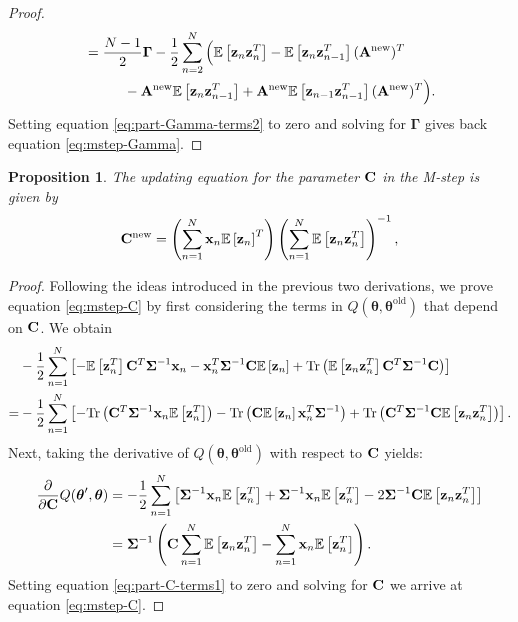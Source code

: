 \documentclass[11pt]{article}
\numberwithin{equation}{section}
\newcommand{\expectation}[1]{\mathbb{E}\left[#1\right]}
\newcommand{\Tr}[1]{\text{Tr}\left(#1\right)}
\newcommand{\x}{{\bf x}}
\newcommand{\z}{{\bf z}}
\newtheorem{proposition}{Proposition}[section]
\begin{document}
\begin{proof}
\begin{align}
		&= \frac{N-1}{2}\boldsymbol\Gamma -\frac{1}{2}\sum_{n=2}^N\Big(\expectation{\z_n\z_n^T} - \expectation{\z_n\z_{n-1}^T}({\bf A}^{\text{new}})^T  \nonumber \\
		& \hspace{1cm} - {\bf A}^{\text{new}}\expectation{\z_n\z_{n-1}^T} + {\bf A}^{\text{new}}\expectation{\z_{n-1}\z_{n-1}^T}({\bf A}^{\text{new}})^T\Big). \label{eq:part-Gamma-terms2}
	\end{align}	
	Setting equation \eqref{eq:part-Gamma-terms2} to zero and solving for $\boldsymbol{\Gamma}$ gives back equation \eqref{eq:mstep-Gamma}.
\end{proof}

\begin{proposition}
	The updating equation for the parameter ${\bf C}$ in the M-step is given by
	\begin{align}
		{\bf C}^{\text{\normalfont new}} &= \left(\sum_{n=1}^N \x_n \expectation{\z_n}^T \right)\left(\sum_{n=1}^N \expectation{\z_n \z_n^T} \right)^{-1}, \label{eq:mstep-C}\\
	\end{align}
\end{proposition}

\begin{proof}
	Following the ideas introduced in the previous two derivations, we prove equation \eqref{eq:mstep-C} by first considering the terms in $Q(\boldsymbol\theta, \boldsymbol\theta^\text{old})$ that depend on $\bf C$. We obtain
	\begin{align}
		& -\frac{1}{2}\sum_{n=1}^N \left[ -\expectation{\z_n^T} {\bf C}^T \boldsymbol{\Sigma}^{-1}\x_n - \x_n^T \boldsymbol{\Sigma}^{-1} {\bf C} \expectation{\z_n} + \text{Tr}\left(\expectation{\z_n\z_n^T}{\bf C}^T\boldsymbol\Sigma^{-1}{\bf C}\right)\right]\\
		=& -\frac{1}{2}\sum_{n=1}^N \left[ -\Tr{{\bf C}^T\boldsymbol{\Sigma}^{-1}\x_n \expectation{\z_n^T}} - \Tr{{\bf C}\expectation{\z_n}\x_n^T\boldsymbol{\Sigma}^{-1}} +  \Tr{{\bf C}^T\boldsymbol{\Sigma}^{-1}{\bf C}\expectation{\z_n\z_n^T}} \right].
	\end{align}
	Next, taking the derivative of $Q(\boldsymbol{\theta}, \boldsymbol{\theta}^{\text{old}})$ with respect to $\bf C$ yields:
	\begin{align}
		\frac{\partial}{\partial {\bf C}} Q(\boldsymbol{\theta}', \boldsymbol{\theta}) &= -\frac{1}{2}\sum_{n=1}^N \left[ \boldsymbol{\Sigma}^{-1} \x_n \expectation{\z_n^T} + \boldsymbol{\Sigma}^{-1}\x_n\expectation{\z_n^T} - 2 \boldsymbol{\Sigma}^{-1}{\bf C}\expectation{\z_n\z_n^T} \right] \\
		&= \boldsymbol{\Sigma}^{-1} \left( {\bf C} \sum_{n=1}^N \expectation{\z_n\z_n^T} - \sum_{n=1}^N\x_n\expectation{\z_n^T} \right). \label{eq:part-C-terms1}
	\end{align}
	Setting equation \eqref{eq:part-C-terms1} to zero and solving for $\bf C$ we arrive at equation \eqref{eq:mstep-C}.
\end{proof}
\end{document}

